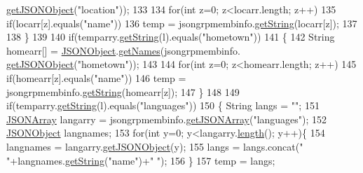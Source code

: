 \begin{DoxyCode}
      \hyperlink{classorg_1_1json_1_1_j_s_o_n_object_a6011679cb15a3aac5944bb4a8af9f7fb}{getJSONObject}(\textcolor{stringliteral}{"location"}));
133         
134         \textcolor{keywordflow}{for}(\textcolor{keywordtype}{int} z=0; z<locarr.length; z++)
135         \textcolor{keywordflow}{if}(locarr[z].equals(\textcolor{stringliteral}{"name"}))
136             temp = jsongrpmembinfo.\hyperlink{classorg_1_1json_1_1_j_s_o_n_object_a7140df2bac96f4d75a3f338ed16d1212}{getString}(locarr[z]);
137             
138     \}
139     
140     \textcolor{keywordflow}{if}(temparry.\hyperlink{classorg_1_1json_1_1_j_s_o_n_array_a3b52ac3d94f48cdddf503e7872653591}{getString}(l).equals(\textcolor{stringliteral}{"hometown"}))
141     \{
142         String homearr[] = \hyperlink{classorg_1_1json_1_1_j_s_o_n_object}{JSONObject}.\hyperlink{classorg_1_1json_1_1_j_s_o_n_object_a30d4e44e4c8e03341c346970a00ba283}{getNames}(jsongrpmembinfo.
      \hyperlink{classorg_1_1json_1_1_j_s_o_n_object_a6011679cb15a3aac5944bb4a8af9f7fb}{getJSONObject}(\textcolor{stringliteral}{"hometown"}));
143         
144         \textcolor{keywordflow}{for}(\textcolor{keywordtype}{int} z=0; z<homearr.length; z++)
145             \textcolor{keywordflow}{if}(homearr[z].equals(\textcolor{stringliteral}{"name"}))
146                 temp = jsongrpmembinfo.\hyperlink{classorg_1_1json_1_1_j_s_o_n_object_a7140df2bac96f4d75a3f338ed16d1212}{getString}(homearr[z]);
147     \}
148         
149     \textcolor{keywordflow}{if}(temparry.\hyperlink{classorg_1_1json_1_1_j_s_o_n_array_a3b52ac3d94f48cdddf503e7872653591}{getString}(l).equals(\textcolor{stringliteral}{"languages"}))
150     \{   String langs = \textcolor{stringliteral}{""};
151         \hyperlink{classorg_1_1json_1_1_j_s_o_n_array}{JSONArray} langarry = jsongrpmembinfo.\hyperlink{classorg_1_1json_1_1_j_s_o_n_object_a884ee44fe958e9ea737d6c5e1180cb62}{getJSONArray}(\textcolor{stringliteral}{"languages"});
152         \hyperlink{classorg_1_1json_1_1_j_s_o_n_object}{JSONObject} langnames;
153         \textcolor{keywordflow}{for}(\textcolor{keywordtype}{int} y=0; y<langarry.\hyperlink{classorg_1_1json_1_1_j_s_o_n_array_a8382a78090007f650a02895ecbf3c8ec}{length}(); y++)\{
154             langnames = langarry.\hyperlink{classorg_1_1json_1_1_j_s_o_n_array_a7f3e6fc64826daba30f40964cd92e57e}{getJSONObject}(y);
155             langs = langs.concat(\textcolor{stringliteral}{" "}+langnames.\hyperlink{classorg_1_1json_1_1_j_s_o_n_object_a7140df2bac96f4d75a3f338ed16d1212}{getString}(\textcolor{stringliteral}{"name"})+\textcolor{stringliteral}{" "});
156         \}
157         temp = langs;

\end{DoxyCode}
